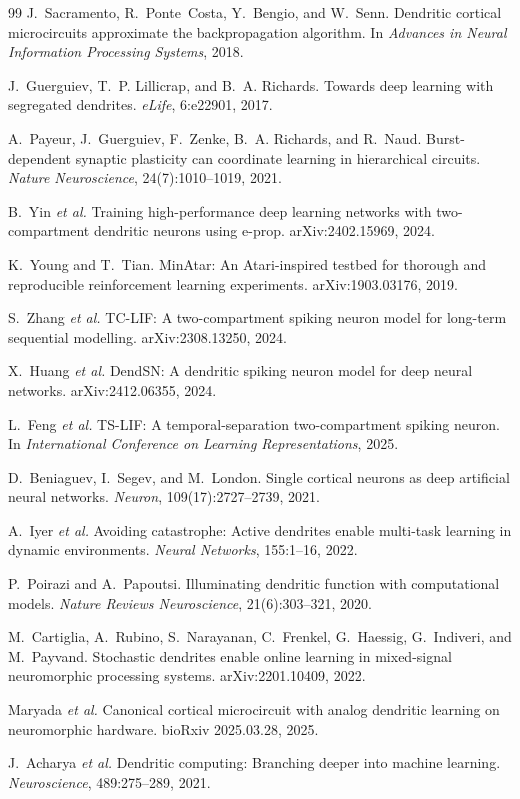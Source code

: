 \documentclass[11pt]{article}
\begin{document}
\begin{thebibliography}{99}
J.~Sacramento, R.~Ponte~Costa, Y.~Bengio, and W.~Senn.
\newblock Dendritic cortical microcircuits approximate the backpropagation algorithm.
\newblock In \emph{Advances in Neural Information Processing Systems}, 2018.

J.~Guerguiev, T.~P. Lillicrap, and B.~A. Richards.
\newblock Towards deep learning with segregated dendrites.
\newblock \emph{eLife}, 6:e22901, 2017.

A.~Payeur, J.~Guerguiev, F.~Zenke, B.~A. Richards, and R.~Naud.
\newblock Burst-dependent synaptic plasticity can coordinate learning in hierarchical circuits.
\newblock \emph{Nature Neuroscience}, 24(7):1010--1019, 2021.

B.~Yin \emph{et al.}
\newblock Training high-performance deep learning networks with two-compartment dendritic neurons using e-prop.
\newblock arXiv:2402.15969, 2024.

K.~Young and T.~Tian.
\newblock MinAtar: An Atari-inspired testbed for thorough and reproducible reinforcement learning experiments.
\newblock arXiv:1903.03176, 2019.

S.~Zhang \emph{et al.}
\newblock TC-LIF: A two-compartment spiking neuron model for long-term sequential modelling.
\newblock arXiv:2308.13250, 2024.

X.~Huang \emph{et al.}
\newblock DendSN: A dendritic spiking neuron model for deep neural networks.
\newblock arXiv:2412.06355, 2024.

L.~Feng \emph{et al.}
\newblock TS-LIF: A temporal-separation two-compartment spiking neuron.
\newblock In \emph{International Conference on Learning Representations}, 2025.

D.~Beniaguev, I.~Segev, and M.~London.
\newblock Single cortical neurons as deep artificial neural networks.
\newblock \emph{Neuron}, 109(17):2727--2739, 2021.

A.~Iyer \emph{et al.}
\newblock Avoiding catastrophe: Active dendrites enable multi-task learning in dynamic environments.
\newblock \emph{Neural Networks}, 155:1--16, 2022.

P.~Poirazi and A.~Papoutsi.
\newblock Illuminating dendritic function with computational models.
\newblock \emph{Nature Reviews Neuroscience}, 21(6):303--321, 2020.

M.~Cartiglia, A.~Rubino, S.~Narayanan, C.~Frenkel, G.~Haessig, G.~Indiveri,
and M.~Payvand.
\newblock Stochastic dendrites enable online learning in mixed-signal neuromorphic processing systems.
\newblock arXiv:2201.10409, 2022.

Maryada \emph{et al.}
\newblock Canonical cortical microcircuit with analog dendritic learning on neuromorphic hardware.
\newblock bioRxiv 2025.03.28, 2025.

J.~Acharya \emph{et al.}
\newblock Dendritic computing: Branching deeper into machine learning.
\newblock \emph{Neuroscience}, 489:275--289, 2021.

\end{thebibliography}
\end{document}
